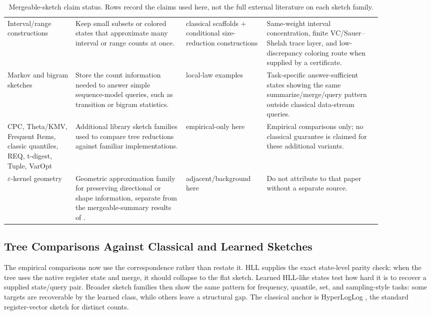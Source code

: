 \begin{table}[t]
\begin{tabular}{@{}p{0.16\linewidth}p{0.26\linewidth}p{0.18\linewidth}p{0.27\linewidth}@{}}
Interval/range constructions & Keep small subsets or colored states that approximate many interval or range counts at once. & classical scaffolds + conditional size-reduction constructions & Same-weight interval concentration, finite VC/Sauer--Shelah trace layer, and low-discrepancy coloring route when supplied by a certificate. \\
Markov and bigram sketches & Store the count information needed to answer simple sequence-model queries, such as transition or bigram statistics. & local-law examples & Task-specific answer-sufficient states showing the same summarize/merge/query pattern outside classical data-stream queries. \\
CPC, Theta/KMV, Frequent Items, classic quantiles, REQ, t-digest, Tuple, VarOpt & Additional library sketch families used to compare tree reductions against familiar implementations. & empirical-only here & Empirical comparisons only; no classical guarantee is claimed for these additional variants. \\
\(\varepsilon\)-kernel geometry & Geometric approximation family for preserving directional or shape information, separate from the mergeable-summary results of \citet{Agarwal2013MergeableTODS}. & adjacent/background here & Do not attribute to that paper without a separate source. \\
\bottomrule
\end{tabular}
\caption{Mergeable-sketch claim status. Rows record the claims used
here, not the full external literature on each sketch family.}
\label{tab:v7-sketch-inventory}
\end{table}

\subsection{Tree Comparisons Against Classical and Learned Sketches}
\label{sec:v7-tree-comparisons}

The empirical comparisons now use the correspondence rather than
restate it. HLL supplies the exact state-level parity check: when the
tree uses the native register state and merge, it should collapse to
the flat sketch. Learned HLL-like states test how hard it is to recover
a supplied state/query pair. Broader sketch families then show the
same pattern for frequency, quantile, set, and sampling-style tasks:
some targets are recoverable by the learned class, while others leave a
structural gap. The classical anchor is HyperLogLog
\citep{FlajoletEtAl2007,HeuleEtAl2013}, the standard register-vector
sketch for distinct counts.

